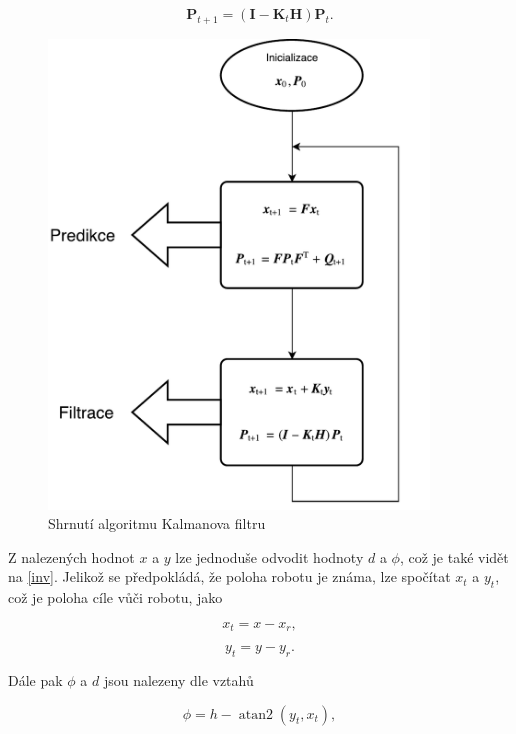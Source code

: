 \documentclass[twoside]{ctuthesis}
\theoremstyle{plain}
\theoremstyle{definition}
\theoremstyle{note}
\DeclareMathOperator{\atantwo}{atan2}
\begin{document}
\begin{equation}	
\boldsymbol{P}_{t+1} = (\boldsymbol{I} - \boldsymbol{K}_t\boldsymbol{H})\boldsymbol{P}_t.
\end{equation}
\begin{figure}
	\caption{Shrnutí algoritmu Kalmanova filtru}
	
	\label{kalman_diag}
	\includegraphics[width=0.9\textwidth, height=0.9\textwidth]{images/2/kalman_diagram.pdf}
\end{figure}
Z nalezených hodnot $x$ a $y$ lze jednoduše odvodit hodnoty $d$ a $\phi$, což je také vidět na \ref{inv}. Jelikož se předpokládá, že poloha robotu je známa, lze spočítat $x_t$ a $y_t$, což je poloha cíle vůči robotu, jako

\begin{equation}
x_t = x - x_r,
\end{equation}

\begin{equation}
y_t = y - y_r.
\end{equation}

Dále pak $\phi$ a $d$ jsou nalezeny dle vztahů

\begin{equation}
\phi = h - \atantwo(y_t, x_t),
\end{equation}
\end{document}
